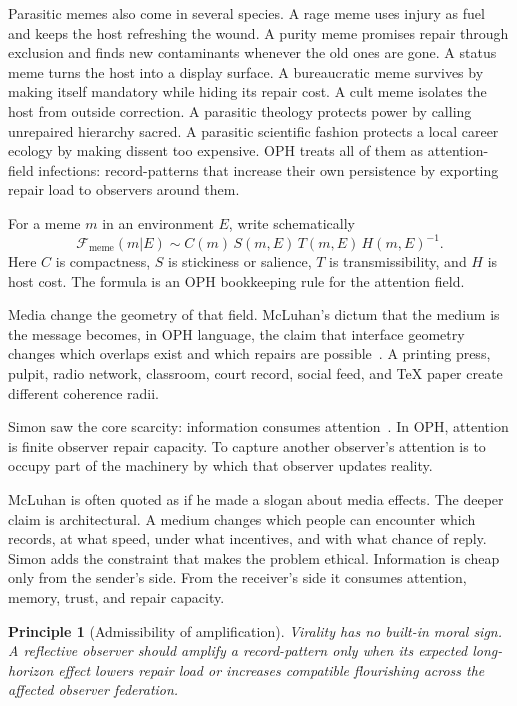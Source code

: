 \documentclass[11pt]{article}
\newtheorem{principle}[definition]{Principle}
\theoremstyle{remark}
\theoremstyle{plain}
\begin{document}
Parasitic memes also come in several species. A rage meme uses injury as fuel
and keeps the host refreshing the wound. A purity meme promises repair through
exclusion and finds new contaminants whenever the old ones are gone. A status
meme turns the host into a display surface. A bureaucratic meme survives by
making itself mandatory while hiding its repair cost. A cult meme isolates the
host from outside correction. A parasitic theology protects power by calling
unrepaired hierarchy sacred. A parasitic scientific fashion protects a local
career ecology by making dissent too expensive. OPH treats all of them as
attention-field infections: record-patterns that increase their own persistence
by exporting repair load to observers around them.

For a meme \(m\) in an environment \(E\), write schematically
\[
\mathcal F_{\mathrm{meme}}(m|E)
\sim
C(m)\,S(m,E)\,T(m,E)\,H(m,E)^{-1}.
\]
Here \(C\) is compactness, \(S\) is stickiness or salience, \(T\) is
transmissibility, and \(H\) is host cost. The formula is an OPH bookkeeping
rule for the attention field.

Media change the geometry of that field. McLuhan's dictum that the medium is
the message becomes, in OPH language, the claim that interface geometry changes
which overlaps exist and which repairs are possible~\cite{McLuhan1964}. A
printing press, pulpit, radio network, classroom, court record, social feed,
and TeX paper create different coherence radii.

Simon saw the core scarcity: information consumes attention~\cite{Simon1971}.
In OPH, attention is finite observer repair capacity. To capture another
observer's attention is to occupy part of the machinery by which that observer
updates reality.

McLuhan is often quoted as if he made a slogan about media effects. The deeper
claim is architectural. A medium changes which people can encounter which
records, at what speed, under what incentives, and with what chance of reply.
Simon adds the constraint that makes the problem ethical. Information is cheap
only from the sender's side. From the receiver's side it consumes attention,
memory, trust, and repair capacity.

\begin{principle}[Admissibility of amplification]
Virality has no built-in moral sign. A reflective observer should amplify a
record-pattern only when its expected long-horizon effect lowers repair load or
increases compatible flourishing across the affected observer federation.
\end{principle}
\end{document}
